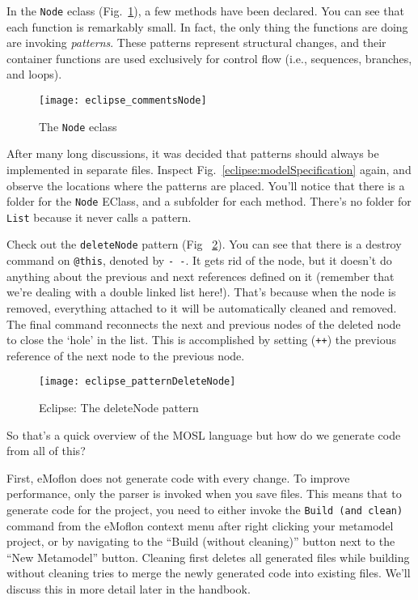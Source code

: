 In the \texttt{Node} eclass (Fig.~\ref{eclipse:eclassNode}), a few methods have been declared. You can see that each function is remarkably small. In fact,
the only thing the functions are doing are invoking \emph{patterns}. These patterns represent structural changes, and their container functions are used
exclusively for control flow (i.e., sequences, branches, and loops).

 \begin{figure}[htbp]
  \centering
  \texttt{[image: eclipse\_commentsNode]}
  \caption{The \texttt{Node} eclass}
  \label{eclipse:eclassNode}
\end{figure}

After many long discussions, it was decided that patterns should always be implemented in separate files. Inspect Fig.~\ref{eclipse:modelSpecification} again,
and observe the locations where the patterns are placed. You'll notice that
there is a folder for the \texttt{Node} EClass, and a subfolder for each method.
There's no folder for \texttt{List} because it never calls a pattern.

Check out the \texttt{deleteNode} pattern (Fig ~\ref{eclipse:patternDeleteNode}). You can see that there is a destroy command on \texttt{@this}, denoted by
\texttt{-~-}. It gets rid of the node, but it doesn't do anything about the previous and next references defined on it (remember that we're dealing with a
double linked list here!). That's because when the node is removed, everything attached to it will be automatically cleaned and removed. The final command
reconnects the next and previous nodes of the deleted node to close the `hole' in the list. This is accomplished by setting (\texttt{++}) the previous reference
of the next node to the previous node.

 \begin{figure}[htbp]
  \centering
  \texttt{[image: eclipse\_patternDeleteNode]}
  \caption{Eclipse: The deleteNode pattern}
  \label{eclipse:patternDeleteNode}
\end{figure}
 
So that's a quick overview of the MOSL language but how do we generate code from all of this?

First, eMoflon does not generate code with every change. To improve performance, only the parser is invoked when you save files. This means that to generate
code for the project, you need to either invoke the \texttt{Build (and clean)} command from the eMoflon context menu after right clicking your metamodel
project, or by navigating to the ``Build (without cleaning)'' button next to the ``New Metamodel'' button. Cleaning first deletes all generated files while
building without cleaning tries to merge the newly generated code into existing files. We'll discuss this in more detail later in the handbook.
